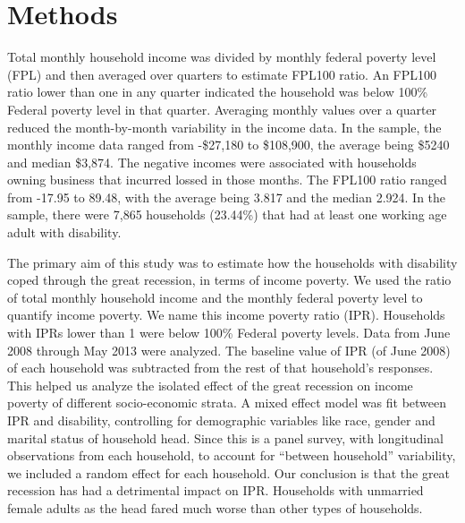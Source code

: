 \documentclass[11pt]{extarticle} %
\begin{document}
\section{Methods}
Total monthly household income was divided by monthly federal poverty level (FPL) and then averaged over quarters to estimate FPL100 ratio. An FPL100 ratio lower than one in any quarter indicated the household was below 100\% Federal poverty level in that quarter. Averaging monthly values over a quarter reduced the month-by-month variability in the income data. In the sample, the monthly income data ranged from -\$27,180 to \$108,900, the average being \$5240 and median \$3,874. The negative incomes were associated with households owning business that incurred lossed in those months. The FPL100 ratio ranged from -17.95 to 89.48, with the average being 3.817 and the median 2.924. In the sample, there were 7,865 households (23.44\%) that had at least one working age adult with disability. 

The primary aim of this study was to estimate how the households with disability coped through the great recession, in terms of income poverty. We used the ratio of total monthly household income and the monthly federal poverty level to quantify income poverty. We name this income poverty ratio (IPR).  Households with IPRs lower than 1 were below 100\% Federal poverty levels. Data from June 2008 through May 2013 were analyzed. The baseline value of IPR (of June 2008) of each household was subtracted from the rest of that household's responses. This helped us analyze the isolated effect of the great recession on income poverty of different socio-economic strata. A mixed effect model was fit between IPR and disability, controlling for demographic variables like race, gender and marital status of household head. Since this is a panel survey, with longitudinal observations from each household, to account for ``between household'' variability, we included a random effect for each household. Our conclusion is that the great recession has had a detrimental impact on IPR. Households with unmarried female adults as the head fared much worse than other types of households. 
\end{document}
